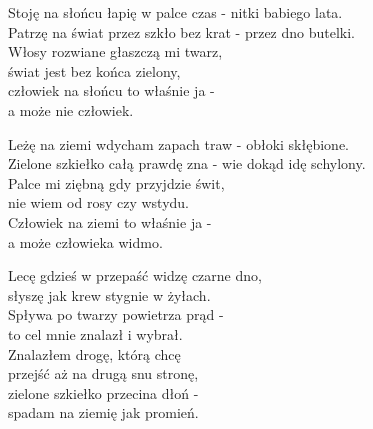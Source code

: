 \begin{text}
    Stoję na słońcu łapię w palce czas - nitki babiego lata.\\
    Patrzę na świat przez szkło bez krat - przez dno butelki.\\
    Włosy rozwiane głaszczą mi twarz,\\
    świat jest bez końca zielony,\\
    człowiek na słońcu to właśnie ja -\\
    a może nie człowiek.

    Leżę na ziemi wdycham zapach traw - obłoki skłębione.\\
    Zielone szkiełko całą prawdę zna - wie dokąd idę schylony.\\
    Palce mi ziębną gdy przyjdzie świt,\\
    nie wiem od rosy czy wstydu.\\
    Człowiek na ziemi to właśnie ja -\\
    a może człowieka widmo.

    Lecę gdzieś w przepaść widzę czarne dno,\\
    słyszę jak krew stygnie w żyłach.\\
    Spływa po twarzy powietrza prąd -\\
    to cel mnie znalazł i wybrał.\\
    Znalazłem drogę, którą chcę\\
    przejść aż na drugą snu stronę,\\
    zielone szkiełko przecina dłoń -\\
    spadam na ziemię jak promień.
\end{text}
\begin{chord}

\end{chord}